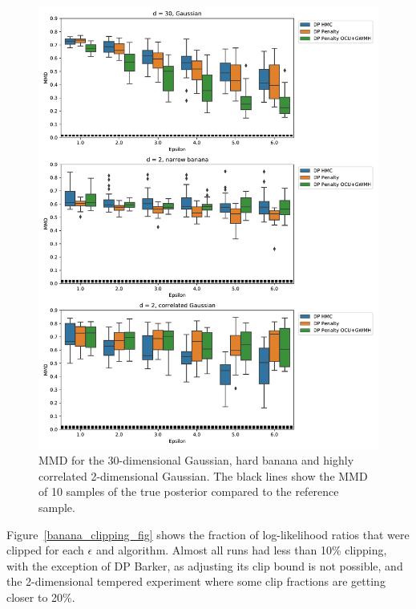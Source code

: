 \documentclass[english,twoside,openright]{HYgraduMLDS}
\begin{document}
\begin{figure}
  \centering
  \includegraphics[width=\textwidth]{figures/banana_extra.pdf}
  \caption{
    MMD for the 30-dimensional Gaussian, hard banana and highly correlated
    2-dimensional Gaussian. The black lines show the MMD of 10 samples of the
    true posterior compared to the reference sample.
  }
  \label{banana_extra_mmd_fig}
\end{figure}

Figure~\ref{banana_clipping_fig} shows the fraction of log-likelihood ratios
that were clipped for each \(\epsilon\) and algorithm. Almost all runs had
less than 10\% clipping, with the exception of DP Barker, as adjusting its
clip bound is not possible, and the 2-dimensional tempered experiment where
some clip fractions are getting closer to 20\%.
\end{document}
